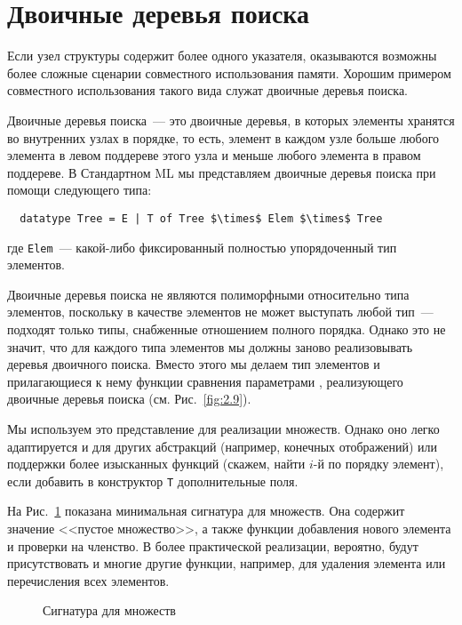 \section{Двоичные деревья поиска}
\label{sc:2.2}

Если узел структуры содержит более одного указателя, оказываются
возможны более сложные сценарии совместного использования памяти. Хорошим примером
совместного использования такого вида служат двоичные деревья поиска.

Двоичные деревья поиска~--- это двоичные деревья, в которых элементы
хранятся во внутренних узлах в 
порядке, то есть, элемент в каждом узле больше любого элемента в
левом поддереве этого узла и меньше любого элемента в правом
поддереве. В Стандартном ML мы представляем двоичные деревья поиска
при помощи следующего типа:
\begin{lstlisting}
  datatype Tree = E | T of Tree $\times$ Elem $\times$ Tree
\end{lstlisting}
где \lstinline!Elem!~--- какой-либо фиксированный полностью упорядоченный
тип элементов.

\begin{remark}
  Двоичные деревья поиска не являются полиморфными относительно типа
  элементов, поскольку в качестве элементов не может выступать любой
  тип~--- подходят только типы, снабженные отношением полного
  порядка. Однако это не значит, что для каждого типа элементов мы
  должны заново реализовывать деревья двоичного поиска. Вместо этого
  мы делаем тип элементов и прилагающиеся к нему функции сравнения
  параметрами , реализующего двоичные деревья
  поиска (см. Рис.~\ref{fig:2.9}).
\end{remark}

Мы используем это представление для реализации множеств. Однако оно
легко адаптируется и для других абстракций (например, конечных
отображений) или поддержки более изысканных функций (скажем, найти
$i$-й по порядку элемент), если добавить в конструктор \lstinline!T!
дополнительные поля.

На Рис.~\ref{fig:2.7} показана минимальная сигнатура для множеств. Она
содержит значение <<пустое множество>>, а также функции добавления
нового элемента и проверки на членство.  В более практической
реализации, вероятно, будут присутствовать и многие другие функции,
например, для удаления элемента или перечисления всех элементов.

\begin{figure}
  \centering

  \caption{Сигнатура для множеств}
  \label{fig:2.7}
\end{figure}

